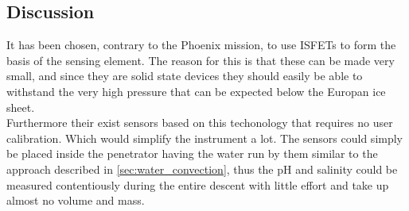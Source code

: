 \subsection{Discussion}

It has been chosen, contrary to the Phoenix mission, to use ISFETs to form the basis of the sensing element. The reason for this is that these can be made very small, and since they are solid state devices they should easily be able to withstand the very high pressure that can be expected below the Europan ice sheet.\\

\noindent
Furthermore their exist sensors based on this techonology that requires no user calibration\cite{website:senova}. Which would simplify the instrument a lot. The sensors could simply be placed inside the penetrator having the water run by them similar to the approach described in \ref{sec:water_convection}, thus the pH and salinity could be measured contentiously during the entire descent with little effort and take up almost no volume and mass.
